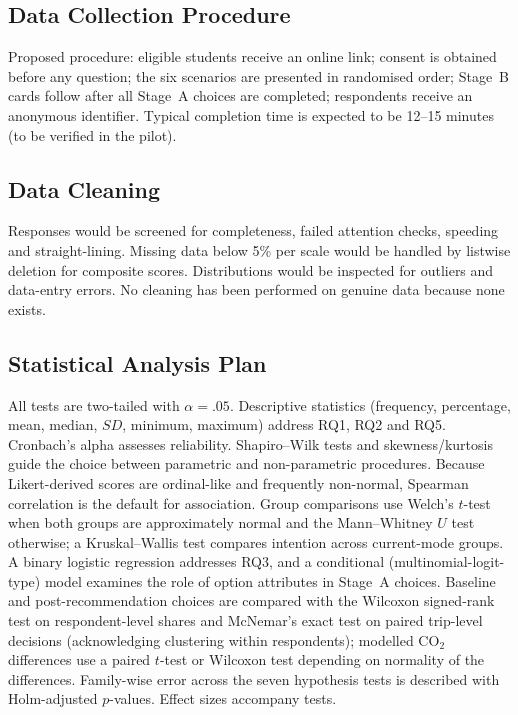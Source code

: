 \documentclass[11pt,a4paper]{article}
\begin{document}
\subsection{Data Collection Procedure}
Proposed procedure: eligible students receive an online link; consent is obtained before any question;
the six scenarios are presented in randomised order; Stage~B cards follow after all Stage~A choices
are completed; respondents receive an anonymous identifier. Typical completion time is expected to be
12--15 minutes (to be verified in the pilot).

\subsection{Data Cleaning}
Responses would be screened for completeness, failed attention checks, speeding and straight-lining.
Missing data below 5\% per scale would be handled by listwise deletion for composite scores.
Distributions would be inspected for outliers and data-entry errors. No cleaning has been performed
on genuine data because none exists.

\subsection{Statistical Analysis Plan}
All tests are two-tailed with $\alpha = .05$. Descriptive statistics (frequency, percentage, mean,
median, $SD$, minimum, maximum) address RQ1, RQ2 and RQ5. Cronbach's alpha assesses reliability.
Shapiro--Wilk tests and skewness/kurtosis guide the choice between parametric and non-parametric
procedures. Because Likert-derived scores are ordinal-like and frequently non-normal, Spearman
correlation is the default for association. Group comparisons use Welch's $t$-test when both groups
are approximately normal and the Mann--Whitney $U$ test otherwise; a Kruskal--Wallis test compares
intention across current-mode groups. A binary logistic regression addresses RQ3, and a conditional
(multinomial-logit-type) model examines the role of option attributes in Stage~A choices. Baseline and
post-recommendation choices are compared with the Wilcoxon signed-rank test on respondent-level
shares and McNemar's exact test on paired trip-level decisions (acknowledging clustering within
respondents); modelled CO$_2$ differences use a paired $t$-test or Wilcoxon test depending on
normality of the differences. Family-wise error across the seven hypothesis tests is described with
Holm-adjusted $p$-values. Effect sizes accompany tests.
\end{document}
